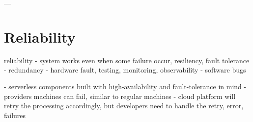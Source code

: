 






---

\section{Reliability}

reliability - system works even when some failure occur, resiliency, fault tolerance
- redundancy - hardware fault, testing, monitoring, observability - software bugs

\label{section:serverless-definition}
- serverless components built with high-availability and fault-tolerance in mind - providers machines can fail, similar to regular machines - cloud platform will retry the processing accordingly, but developers need to handle the retry, error, failures

